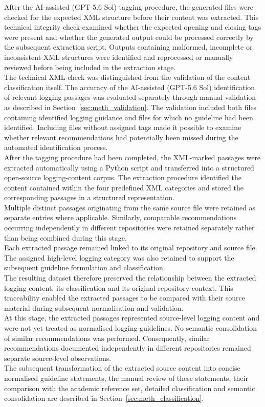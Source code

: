 After the AI-assisted (GPT-5.6 Sol) tagging procedure,
the generated files were checked for the
expected XML structure before their content was extracted. This technical integrity
check examined whether the expected opening and closing tags were present and whether
the generated output could be processed correctly by the subsequent extraction
script. Outputs containing malformed, incomplete or inconsistent XML structures were
identified and reprocessed or manually reviewed before being included in the
extraction stage.
\\
The technical XML check was distinguished from the validation of the content
classification itself. The accuracy of the AI-assisted (GPT-5.6 Sol) identification of relevant
logging passages was evaluated separately through manual validation as described in
Section~\ref{sec:meth_validation}. The validation included both files containing
identified logging guidance and files for which no guideline had been identified.
Including files without assigned tags made it possible to examine whether relevant
recommendations had potentially been missed during the automated identification
process.
\\
After the tagging procedure had been completed, the XML-marked passages were
extracted automatically using a Python script and transferred into a structured
open-source logging-content corpus. The extraction procedure identified the content
contained within the four predefined XML categories and stored the corresponding
passages in a structured representation.
\\
Multiple distinct passages originating from the same source file were retained as
separate entries where applicable. Similarly, comparable recommendations occurring
independently in different repositories were retained separately rather than being
combined during this stage.
\\
Each extracted passage remained linked to its original repository and source file.
The assigned high-level logging category was also retained to support the subsequent
guideline formulation and classification.
\\
The resulting dataset therefore preserved the relationship between the extracted
logging content, its classification and its original repository context. This
traceability enabled the extracted passages to be compared with their source
material during subsequent normalisation and validation.
\\
At this stage, the extracted passages represented source-level logging content and
were not yet treated as normalised logging guidelines. No semantic consolidation of
similar recommendations was performed. Consequently, similar recommendations
documented independently in different repositories remained separate source-level
observations.
\\
The subsequent transformation of the extracted source content into concise normalised
guideline statements, the manual review of these statements, their comparison with
the academic reference set, detailed classification and semantic consolidation
are described in Section~\ref{sec:meth_classification}.

